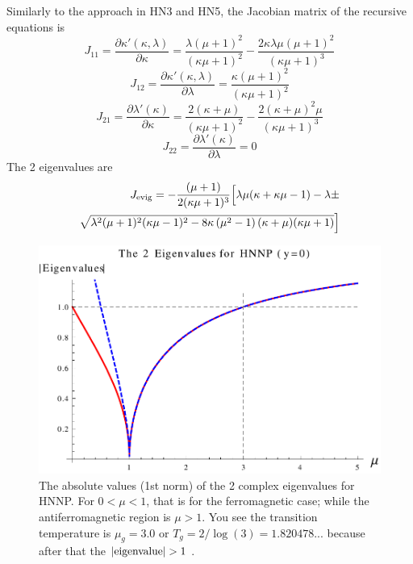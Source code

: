 Similarly to the approach in HN3 and HN5, the Jacobian matrix of the recursive equations is
\begin{equation}
J_{11} = \frac{\partial \kappa'(\kappa, \lambda)}{\partial \kappa}=\frac{\lambda  (\mu +1)^2}{(\kappa  \mu +1)^2}-\frac{2 \kappa  \lambda  \mu  (\mu +1)^2}{(\kappa  \mu +1)^3}
\end{equation}
\begin{equation}
J_{12} = \frac{\partial \kappa'(\kappa, \lambda)}{\partial \lambda}=\frac{\kappa  (\mu +1)^2}{(\kappa  \mu +1)^2}
\end{equation}
\begin{equation}
J_{21} = \frac{\partial \lambda'(\kappa)}{\partial \kappa}=\frac{2 (\kappa +\mu ) }{(\kappa  \mu +1)^2}-\frac{2 (\kappa +\mu )^2 \mu }{(\kappa  \mu +1)^3}
\end{equation}
\begin{equation}
J_{22} = \frac{\partial \lambda'(\kappa)}{\partial \lambda}=0
\end{equation}
The 2 eigenvalues are 
\begin{eqnarray}
J_{\rm evig} = -\frac{(\mu +1)}{2 (\kappa  \mu +1)^3} \Big[\lambda  \mu  (\kappa +\kappa \mu -1)-\lambda \pm \nonumber \\ 
\sqrt{\lambda ^2 (\mu +1)^2 (\kappa  \mu -1)^2-8 \kappa  \left(\mu ^2-1\right) (\kappa +\mu ) (\kappa  \mu +1)} \Big] \nonumber \\
\label{eq:afm-hpeig}
\end{eqnarray}

\begin{figure}
\centering \includegraphics[width=0.6\columnwidth]{Chapter-3/HNNP_eigenvalues.pdf}
\protect\caption{The absolute values (1st norm) of the 2 complex eigenvalues for HNNP. For $0<\mu<1$, that is for the ferromagnetic case; while the antiferromagnetic region is $\mu>1$. You see the transition temperature is $\mu_g=3.0$ or $T_g=2/\log(3)=1.820478...$ because after that the $|{\rm eigenvalue}|>1$ . }
\label{fig:afm-hnnp_eigs} 
\end{figure}

